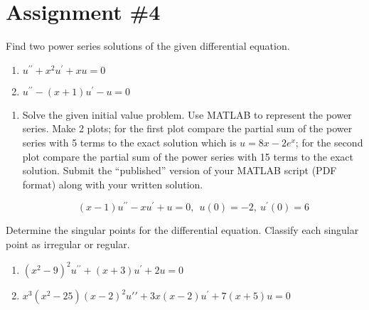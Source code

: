 \chapter{Assignment \#4}
\label{ch:ass4}
\begin{fullwidth}
Find two power series solutions of the given differential equation.
\begin{enumerate}
\item $u^{\prime \prime} + x^2 u^{\prime} + xu = 0$

\vspace{1.0cm}

\item $u^{\prime \prime} - (x+1)u^{\prime} - u = 0$
\end{enumerate}

\vspace{1.0cm}



\begin{enumerate}[resume]
\item Solve the given initial value problem.  Use MATLAB to represent the power series.  Make 2 plots; for the first plot compare the partial sum of the power series with 5 terms to the exact solution which is $u=8x-2e^x$; for the second plot compare the partial sum of the power series with 15 terms to the exact solution.  Submit the ``published'' version of your MATLAB script (PDF format) along with your written solution.

\begin{equation*}
(x-1)u^{\prime \prime} - xu^{\prime} + u = 0, \ \ u(0)=-2, \ u^{\prime}(0) = 6
\end{equation*}
\end{enumerate}

\vspace{1.0cm}

\noindent Determine the singular points for the differential equation.  Classify each singular point as irregular or regular.
\begin{enumerate}[resume]
\item $\left(x^2-9 \right)^2u^{\prime \prime} + (x+3)u^{\prime} + 2u = 0$

\vspace{1.0cm}

\item $x^3\left(x^2 - 25\right)\left(x-2\right)^2u{\prime \prime}+3x(x-2)u^{\prime}+7(x+5)u = 0$
\end{enumerate}

\vspace{1.0cm}


\end{fullwidth}
